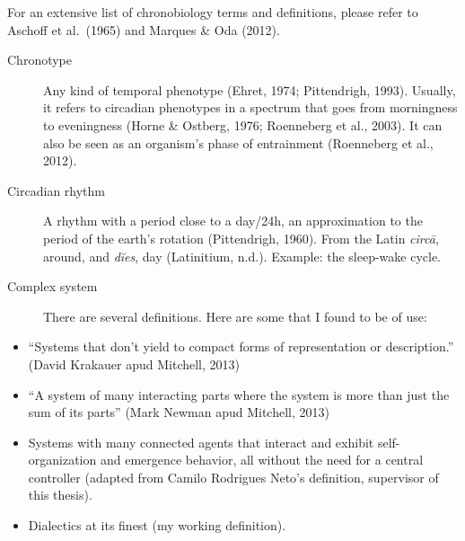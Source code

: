 \begin{termos}
For an extensive list of chronobiology terms and definitions, please
refer to Aschoff et al.~(1965) and Marques \& Oda (2012).

\begin{description}
\item[Chronotype]
\hspace{20cm}

Any kind of temporal phenotype (Ehret, 1974; Pittendrigh, 1993).
Usually, it refers to circadian phenotypes in a spectrum that goes from
morningness to eveningness (Horne \& Ostberg, 1976; Roenneberg et al.,
2003). It can also be seen as an organism's phase of entrainment
(Roenneberg et al., 2012).
\end{description}

\begin{description}
\item[Circadian rhythm]
\hspace{20cm}

A rhythm with a period close to a day/24h, an approximation to the
period of the earth's rotation (Pittendrigh, 1960). From the Latin
\emph{circā}, around, and \emph{dĭes}, day (Latinitium, n.d.). Example:
the sleep-wake cycle.
\end{description}

\begin{description}
\item[Complex system]
\hspace{20cm}

There are several definitions. Here are some that I found to be of use:
\end{description}

\begin{itemize}
\tightlist
\item
  ``Systems that don't yield to compact forms of representation or
  description.'' (David Krakauer apud Mitchell, 2013)
\item
  ``A system of many interacting parts where the system is more than
  just the sum of its parts'' (Mark Newman apud Mitchell, 2013)
\item
  Systems with many connected agents that interact and exhibit
  self-organization and emergence behavior, all without the need for a
  central controller (adapted from Camilo Rodrigues Neto's definition,
  supervisor of this thesis).
\item
  Dialectics at its finest (my working definition).
\end{itemize}


\end{termos}
